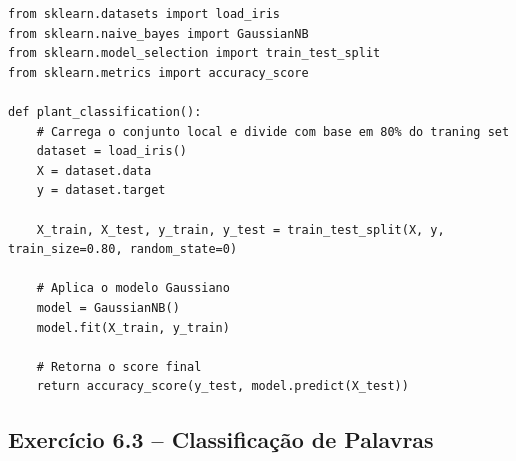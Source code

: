 \documentclass[11pt,a4paper]{article}
\begin{document}
\begin{solucao}
\begin{lstlisting}
from sklearn.datasets import load_iris
from sklearn.naive_bayes import GaussianNB
from sklearn.model_selection import train_test_split
from sklearn.metrics import accuracy_score

def plant_classification():
    # Carrega o conjunto local e divide com base em 80% do traning set
    dataset = load_iris()
    X = dataset.data
    y = dataset.target
    
    X_train, X_test, y_train, y_test = train_test_split(X, y, train_size=0.80, random_state=0)
    
    # Aplica o modelo Gaussiano
    model = GaussianNB()
    model.fit(X_train, y_train)
    
    # Retorna o score final
    return accuracy_score(y_test, model.predict(X_test))
\end{lstlisting}
\end{solucao}

\subsection*{Exercício 6.3 -- Classificação de Palavras}
\end{document}
